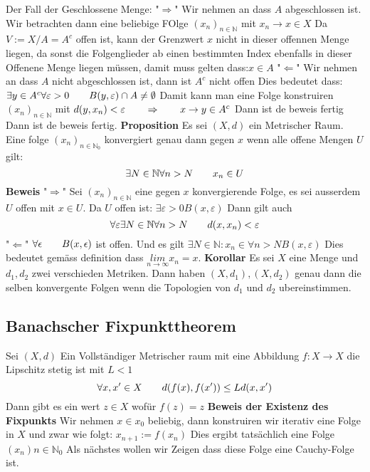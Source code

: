 \documentclass{article}
\newcommand{\mspc}{\hspace{0.7cm}}
\begin{document}
Der Fall der Geschlossene Menge:\newline
"$\Rightarrow$" Wir nehmen an dass $A$ abgeschlossen ist. Wir betrachten dann eine beliebige FOlge $(x_n)_{n\in\mathbb{N}}$ mit $x_n\rightarrow x\in X$ Da $V:=X/A=A^c$ offen ist, kann der Grenzwert $x$ nicht in dieser offennen Menge liegen, da sonst die Folgenglieder ab einen bestimmten Index ebenfalls in dieser Offenene Menge liegen müssen, damit muss gelten dass:$x\in A$\newline
"$\Leftarrow$" Wir nehmen an dass $A$ nicht abgeschlossen ist, dann ist $A^c$ nicht offen Dies bedeutet dass: $\exists y\in A^c \forall \varepsilon>0 \mspc B(y,\varepsilon) \cap A \neq \emptyset$ Damit kann man eine Folge konstruiren 
$(x_n)_{n\in\mathbb{N}}$ mit $d(y,x_n)<\varepsilon \mspc \Rightarrow\mspc x\rightarrow y\in A^c$ Dann ist de beweis fertig Dann ist de beweis fertig.\newline
\noindent
\textbf{Proposition} Es sei $(X,d)$ ein Metrischer Raum. Eine folge $(x_n)_{n\in\mathbb{N}_0}$ konvergiert genau dann gegen $x$ wenn alle offene Mengen $U$ gilt:\[\exists N\in \mathbb{N}\forall n>N\mspc x_n\in U\]\newline
\textbf{Beweis}
"$\Rightarrow$" Sei $(x_n)_{n\in\mathbb{N}}$ eine gegen $x$ konvergierende Folge, es sei ausserdem $U$ offen mit $x\in U$. Da $U$ offen ist: $\exists \varepsilon >0 B(x,\varepsilon)$ Dann gilt auch \[\forall \varepsilon \exists N\in\mathbb{N} \forall n>N \mspc d(x,x_n)<\varepsilon\]
\newline
"$\Leftarrow$" $\forall \epsilon \mspc B(x, \epsilon)$ ist offen. Und es gilt $\exists N\in\mathbb{N} : x_n\in\forall n>N B(x, \varepsilon)$ Dies bedeutet gemäss definition dass $\underset{n\rightarrow\infty}{lim} x_n=x$. \newline
\textbf{Korollar} Es sei $X$ eine Menge und $d_1, d_2$ zwei verschieden Metriken. Dann haben $(X,d_1), (X, d_2)$ genau dann die selben konvergente Folgen wenn die Topologien von $d_1$ und $d_2$ ubereinstimmen. 
\newline\subsection{Banachscher Fixpunkttheorem}
Sei $(X,d)$ Ein Vollständiger Metrischer raum mit eine Abbildung $f:X\rightarrow X$ die Lipschitz stetig ist mit $L<1$\[\forall x,x'\in X\mspc d(f(x),f(x'))\le Ld(x,x')\]
Dann gibt es ein wert $z\in X$ wofür $f(z)=z$
\newline
\textbf{Beweis der Existenz des Fixpunkts} Wir nehmen $x\in x_0$ beliebig, dann konstruiren wir iterativ eine Folge in $X$ und zwar wie folgt: $x_{n+1}:=f(x_n)$ Dies ergibt tatsächlich eine Folge $(x_n)n\in\mathbb{N}_0$ Als nächstes wollen wir Zeigen dass diese Folge eine Cauchy-Folge ist.
\end{document}
